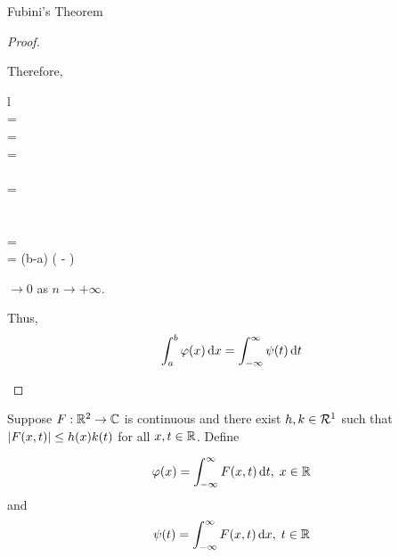 \begin{section}{Fubini's Theorem}
\begin{proof}
\begin{enumerate}[i)]
		Therefore,
			\begin{IEEEeqnarray*}{l}
				 \\
				=  \\
				=  \\
				=  \\
				\leq {} \\
				=  \\
				\leq {} \\
				\leq {} \\
				=  \\
				= (b-a) \left(  -
					 \right)
			\end{IEEEeqnarray*}
		$\rightarrow 0$ as $n \rightarrow +\infty$.
			
		Thus,
			\begin{displaymath}
				\myinta{a}{b}{\varphi(x)}{x} = 
				\myintb{\psi(t)}{t}
			\end{displaymath}
		\end{enumerate}
\end{proof}


\begin{thrm}\label{thrm:Fubini3}
	Suppose $F:\real^2 \to \cmplx$ is continuous and there
	exist $h, k \in \absint$ such that $\modulus{F(x,t)} \leq
	h(x)k(t)$ for all $x,t \in \real$. Define
		
		\begin{displaymath}
			\varphi(x) = \myintb{F(x,t)}{t} , \; \isreal
		\end{displaymath}
	and	
		\begin{displaymath}
			\psi(t) = \myintb{F(x,t)}{x} , \; \isreal[t]
		\end{displaymath}
		

\end{thrm}
\end{section}
